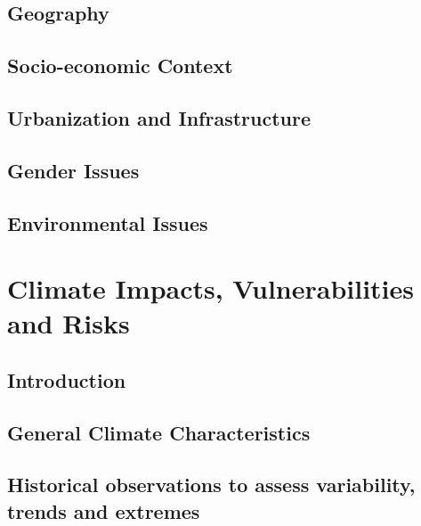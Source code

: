 \documentclass[
]{book}
\begin{document}
\hypertarget{geography}{%
\section{Geography}\label{geography}}

\hypertarget{socio-economic-context}{%
\section{Socio-economic Context}\label{socio-economic-context}}

\hypertarget{urbanization-and-infrastructure}{%
\section{Urbanization and Infrastructure}\label{urbanization-and-infrastructure}}

\hypertarget{gender-issues}{%
\section{Gender Issues}\label{gender-issues}}

\hypertarget{environmental-issues}{%
\section{Environmental Issues}\label{environmental-issues}}

\hypertarget{climate-impacts-vulnerabilities-and-risks}{%
\chapter{Climate Impacts, Vulnerabilities and Risks}\label{climate-impacts-vulnerabilities-and-risks}}

\hypertarget{introduction-2}{%
\section{Introduction}\label{introduction-2}}

\hypertarget{general-climate-characteristics}{%
\section{General Climate Characteristics}\label{general-climate-characteristics}}

\hypertarget{historical-observations-to-assess-variability-trends-and-extremes}{%
\section{Historical observations to assess variability, trends and extremes}\label{historical-observations-to-assess-variability-trends-and-extremes}}
\end{document}
